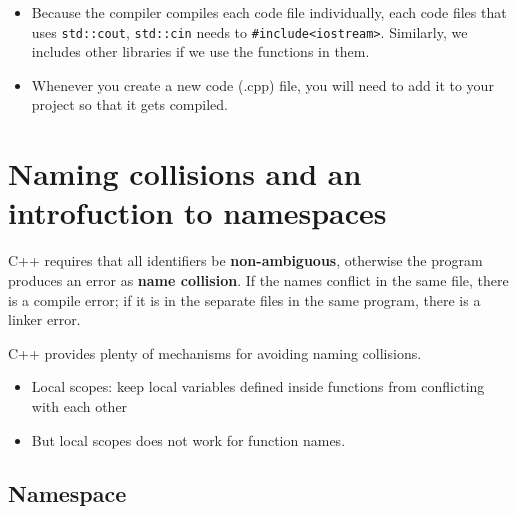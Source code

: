 \documentclass[
  letterpaper,
  DIV=11,
  numbers=noendperiod]{scrreprt}
\providecommand{\tightlist}{%
  \setlength{\itemsep}{0pt}\setlength{\parskip}{0pt}}\usepackage{longtable,booktabs,array}
\begin{document}
\begin{tcolorbox}[enhanced jigsaw, toprule=.15mm, rightrule=.15mm, opacityback=0, breakable, leftrule=.75mm, colback=white, colframe=quarto-callout-tip-color-frame, arc=.35mm, left=2mm, bottomrule=.15mm]
\begin{minipage}[t]{5.5mm}
\textcolor{quarto-callout-tip-color}{\faLightbulb}
\end{minipage}%
\begin{minipage}[t]{\textwidth - 5.5mm}

\begin{itemize}
\item
  Because the compiler compiles each code file individually, each code
  files that uses \texttt{std::cout}, \texttt{std::cin} needs to
  \texttt{\#include\textless{}iostream\textgreater{}}. Similarly, we
  includes other libraries if we use the functions in them.
\item
  Whenever you create a new code (.cpp) file, you will need to add it to
  your project so that it gets compiled.
\end{itemize}

\end{minipage}%
\end{tcolorbox}

\hypertarget{naming-collisions-and-an-introfuction-to-namespaces}{%
\section{Naming collisions and an introfuction to
namespaces}\label{naming-collisions-and-an-introfuction-to-namespaces}}

C++ requires that all identifiers be \textbf{non-ambiguous}, otherwise
the program produces an error as \textbf{name collision}. If the names
conflict in the same file, there is a compile error; if it is in the
separate files in the same program, there is a linker error.

C++ provides plenty of mechanisms for avoiding naming collisions.

\begin{itemize}
\tightlist
\item
  Local scopes: keep local variables defined inside functions from
  conflicting with each other
\item
  But local scopes does not work for function names.
\end{itemize}

\hypertarget{namespace}{%
\subsection{Namespace}\label{namespace}}
\end{document}
